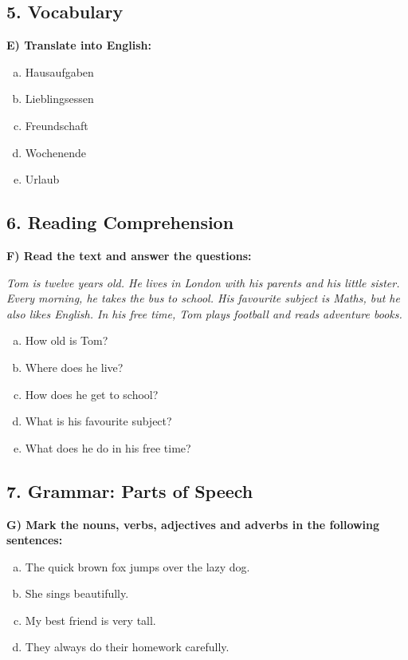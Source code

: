 \subsection*{5. Vocabulary}
\textbf{E) Translate into English:}
\begin{enumerate}[a)]
    \item Hausaufgaben
    \item Lieblingsessen
    \item Freundschaft
    \item Wochenende
    \item Urlaub
\end{enumerate}

\subsection*{6. Reading Comprehension}
\textbf{F) Read the text and answer the questions:}

\textit{Tom is twelve years old. He lives in London with his parents and his little sister. Every morning, he takes the bus to school. His favourite subject is Maths, but he also likes English. In his free time, Tom plays football and reads adventure books.}

\begin{enumerate}[a)]
    \item How old is Tom?
    \item Where does he live?
    \item How does he get to school?
    \item What is his favourite subject?
    \item What does he do in his free time?
\end{enumerate}

\subsection*{7. Grammar: Parts of Speech}
\textbf{G) Mark the nouns, verbs, adjectives and adverbs in the following sentences:}
\begin{enumerate}[a)]
    \item The quick brown fox jumps over the lazy dog.
    \item She sings beautifully.
    \item My best friend is very tall.
    \item They always do their homework carefully.
\end{enumerate}

